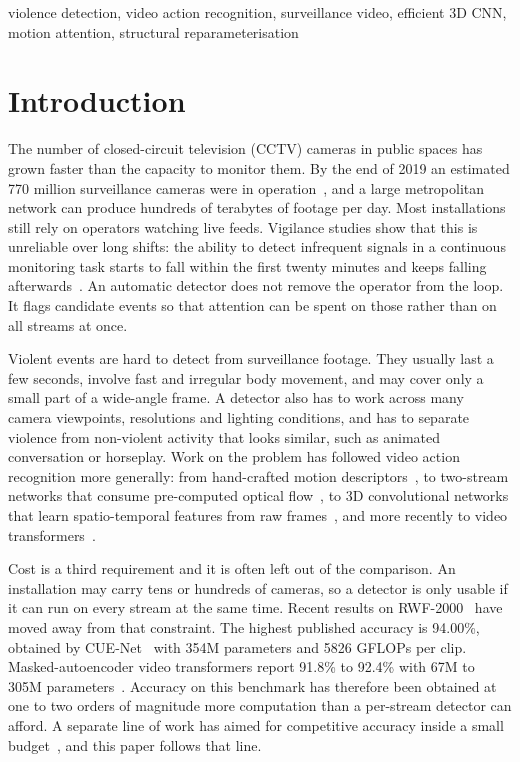 \documentclass[conference]{IEEEtran}
\begin{document}
\begin{IEEEkeywords}
violence detection, video action recognition, surveillance video,
efficient 3D CNN, motion attention, structural reparameterisation
\end{IEEEkeywords}

\section{Introduction}
\label{sec:intro}

The number of closed-circuit television (CCTV) cameras in public spaces
has grown faster than the capacity to monitor them. By the end of 2019
an estimated 770 million surveillance cameras were in
operation~\cite{cnbc2019}, and a large metropolitan network can produce
hundreds of terabytes of footage per day. Most installations still rely
on operators watching live feeds. Vigilance studies show that this is
unreliable over long shifts: the ability to detect infrequent signals in
a continuous monitoring task starts to fall within the first twenty
minutes and keeps falling afterwards~\cite{mackworth1948}. An automatic
detector does not remove the operator from the loop. It flags candidate
events so that attention can be spent on those rather than on all
streams at once.

Violent events are hard to detect from surveillance footage. They
usually last a few seconds, involve fast and irregular body movement,
and may cover only a small part of a wide-angle frame. A detector also
has to work across many camera viewpoints, resolutions and lighting
conditions, and has to separate violence from non-violent activity that
looks similar, such as animated conversation or horseplay. Work on the
problem has followed video action recognition more generally: from
hand-crafted motion descriptors~\cite{idt,vif,hockey}, to two-stream
networks that consume pre-computed optical flow~\cite{twostream}, to 3D
convolutional networks that learn spatio-temporal features from raw
frames~\cite{i3d,slowfast,x3d}, and more recently to video
transformers~\cite{timesformer,videoswin}.

Cost is a third requirement and it is often left out of the comparison.
An installation may carry tens or hundreds of cameras, so a detector is
only usable if it can run on every stream at the same time. Recent
results on RWF-2000~\cite{rwf2000} have moved away from that constraint.
The highest published accuracy is 94.00\%, obtained by
CUE-Net~\cite{cuenet} with 354M parameters and 5826 GFLOPs per clip.
Masked-autoencoder video transformers report 91.8\% to 92.4\% with 67M
to 305M parameters~\cite{videomae,mixvit}. Accuracy on this benchmark
has therefore been obtained at one to two orders of magnitude more
computation than a per-stream detector can afford. A separate line of
work has aimed for competitive accuracy inside a small
budget~\cite{rwf2000,sepconvlstm,mdcn,biltma}, and this paper follows
that line.
\end{document}
